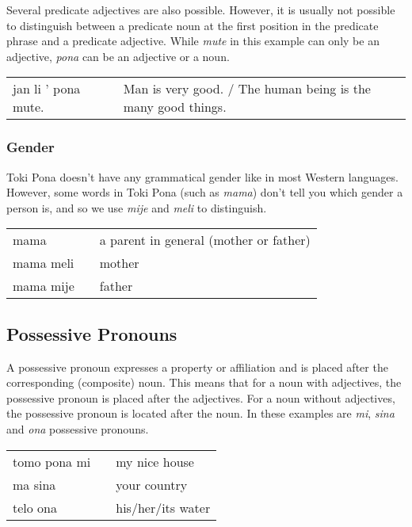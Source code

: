 Several predicate adjectives are also possible.
However, it is usually not possible to distinguish between a predicate noun at the first position in the predicate phrase and a predicate adjective.
While \textit{mute} in this example can only be an adjective, \textit{pona} can be an adjective or a noun.

\begin{supertabular}{p{5,5cm}|ll}
    jan li ' pona mute. &  & Man is very good. / The human being is the many good things. \\
\end{supertabular}

\subsubsection*{Gender}
Toki Pona doesn't have any grammatical gender like in most Western languages.
However, some words in Toki Pona (such as \textit{mama}) don't tell you which gender a person is, and so we use \textit{mije} and \textit{meli} to distinguish.

\begin{supertabular}{p{5,5cm}|ll}
    mama      &  & a parent in general (mother or father) \\
    mama meli &  & mother                                 \\
    mama mije &  & father                                 \\
\end{supertabular}

\subsection*{Possessive Pronouns}
A possessive pronoun expresses a property or affiliation and is placed after the corresponding (composite) noun.
This means that for a noun with adjectives, the possessive pronoun is placed after the adjectives.
For a noun without adjectives, the possessive pronoun is located after the noun.
In these examples are \textit{mi}, \textit{sina} and \textit{ona} possessive pronouns.

\begin{supertabular}{p{5,5cm}|ll}
    tomo pona mi &  & my nice house     \\
    ma sina      &  & your country      \\
    telo ona     &  & his/her/its water \\
\end{supertabular}


